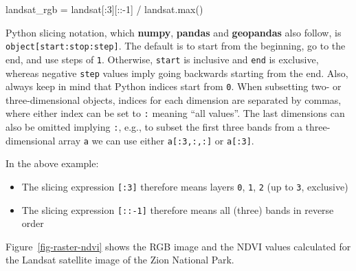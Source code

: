 \documentclass[
  letterpaper,
]{krantz}
\newenvironment{Shaded}{\begin{snugshade}}{\end{snugshade}}
\newcommand{\BuiltInTok}[1]{\textcolor[rgb]{0.00,0.23,0.31}{#1}}
\newcommand{\DecValTok}[1]{\textcolor[rgb]{0.68,0.00,0.00}{#1}}
\newcommand{\NormalTok}[1]{\textcolor[rgb]{0.00,0.23,0.31}{#1}}
\newcommand{\OperatorTok}[1]{\textcolor[rgb]{0.37,0.37,0.37}{#1}}
\providecommand{\tightlist}{%
  \setlength{\itemsep}{0pt}\setlength{\parskip}{0pt}}\usepackage{longtable,booktabs,array}
\begin{document}
\begin{Shaded}
\begin{Highlighting}[]
\NormalTok{landsat\_rgb }\OperatorTok{=}\NormalTok{ landsat[:}\DecValTok{3}\NormalTok{][::}\OperatorTok{{-}}\DecValTok{1}\NormalTok{] }\OperatorTok{/}\NormalTok{ landsat.}\BuiltInTok{max}\NormalTok{()}
\end{Highlighting}
\end{Shaded}

\begin{tcolorbox}[enhanced jigsaw, title=\textcolor{quarto-callout-note-color}{\faInfo}\hspace{0.5em}{Note}, coltitle=black, colbacktitle=quarto-callout-note-color!10!white, breakable, titlerule=0mm, colframe=quarto-callout-note-color-frame, opacitybacktitle=0.6, colback=white, bottomrule=.15mm, left=2mm, leftrule=.75mm, toprule=.15mm, toptitle=1mm, bottomtitle=1mm, arc=.35mm, opacityback=0, rightrule=.15mm]

Python slicing notation, which \textbf{numpy}, \textbf{pandas} and
\textbf{geopandas} also follow, is \texttt{object{[}start:stop:step{]}}.
The default is to start from the beginning, go to the end, and use steps
of \texttt{1}. Otherwise, \texttt{start} is inclusive and \texttt{end}
is exclusive, whereas negative \texttt{step} values imply going
backwards starting from the end. Also, always keep in mind that Python
indices start from \texttt{0}. When subsetting two- or three-dimensional
objects, indices for each dimension are separated by commas, where
either index can be set to \texttt{:} meaning ``all values''. The last
dimensions can also be omitted implying \texttt{:}, e.g., to subset the
first three bands from a three-dimensional array \texttt{a} we can use
either \texttt{a{[}:3,:,:{]}} or \texttt{a{[}:3{]}}.

In the above example:

\begin{itemize}
\tightlist
\item
  The slicing expression \texttt{{[}:3{]}} therefore means layers
  \texttt{0}, \texttt{1}, \texttt{2} (up to \texttt{3}, exclusive)
\item
  The slicing expression \texttt{{[}::-1{]}} therefore means all (three)
  bands in reverse order
\end{itemize}

\end{tcolorbox}

Figure~\ref{fig-raster-ndvi} shows the RGB image and the NDVI values
calculated for the Landsat satellite image of the Zion National Park.
\end{document}
